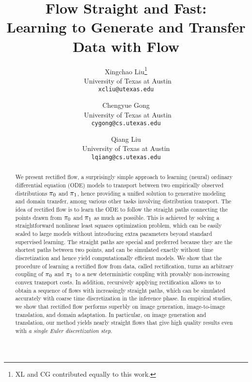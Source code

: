 \documentclass[11pt]{article}
\title{
Flow Straight and Fast: \\ 
 Learning to Generate and Transfer Data with 
 {\Name} Flow 
}
\author{%
	Xingchao Liu\thanks{XL and CG contributed equally to this work.}\\
    ~University of Texas at Austin\\
	\texttt{xcliu@utexas.edu}
	\and
	Chengyue Gong\printfnsymbol{1}\\
	~University of Texas at Austin\\
	\texttt{cygong@cs.utexas.edu} \\
	\and 
	Qiang Liu\\
	University of Texas at Austin\\
	\texttt{lqiang@cs.utexas.edu} \\
}
\date{}
\begin{document}
\newcommand{\PyComment}[1]{\ttfamily\textcolor{commentcolor}{\# #1}}  %
\newcommand{\PyInput}[1]{\ttfamily\textcolor{inputcolor}{\# #1}}
\newcommand{\PyCode}[1]{\ttfamily\textcolor{black}{#1}} %

\maketitle
 
\begin{abstract}
We present rectified flow, 
a  surprisingly simple approach 
to learning (neural) ordinary differential equation (ODE) models to transport between two empirically observed distributions ${\pi}_0$ and ${\pi}_1$,
hence providing a unified solution to 
generative modeling and domain transfer, among various other tasks involving distribution transport. 
The idea of rectified flow is to learn the ODE to follow the straight paths connecting 
the points drawn from ${\pi}_0$ and ${\pi}_1$ as much as possible. 
This is  achieved by solving a straightforward nonlinear least squares optimization problem, 
which can be easily scaled to large models 
without introducing extra parameters beyond standard supervised learning. 
The straight paths  
are special and preferred because they are the shortest  
paths between two points, and can be simulated exactly without time discretization and hence yield computationally efficient models.  
We show that the procedure of learning a rectified flow from data, called rectification, turns an arbitrary coupling of ${\pi}_0$ and ${\pi}_1$ to a  new deterministic coupling with provably non-increasing convex transport costs. 
In addition, recursively applying 
rectification allows us to obtain a sequence of flows with increasingly straight paths, which can be simulated accurately with coarse time discretization in the inference phase. %
In empirical %
studies, 
we show that
rectified flow performs superbly on 
image generation, 
image-to-image translation, and domain adaptation. 
In particular, on image generation and translation, our method yields 
nearly straight flows 
that give high quality results even with \emph{a single Euler discretization step}. 
\end{abstract}
\end{document}
